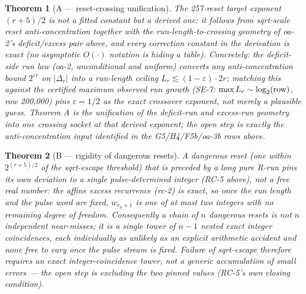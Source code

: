 \documentclass[11pt]{article}
\theoremstyle{plain}
\newtheorem{thm}{Theorem}[section]
\theoremstyle{definition}
\theoremstyle{remark}
\let\origmathrm\mathrm
\renewcommand{\mathrm}[1]{\ifmmode\origmathrm{#1}\else\textrm{#1}\fi}%
\begin{document}
\begin{thm}[A — reset-crossing unification]
The 257-reset target exponent $(r+5)/2$ is not a fitted constant but a \emph{derived} one: it
follows from sqrt-scale reset anti-concentration together with the run-length-to-crossing
geometry of oa-2's deficit/excess pair above, and every correction constant in the derivation is
exact (no asymptotic $O(\cdot)$ notation is hiding a table). Concretely: the deficit-side run law
(oa-2, unconditional and uniform) converts any anti-concentration bound $2^{\varepsilon r}$ on
$|\Delta_r|$ into a run-length ceiling $L_r \lesssim (1-\varepsilon)\cdot 2r$; matching this
against the certified maximum observed run growth (SE-7: $\max L_r \sim \log_2(\mathrm{row})$,
row 200{,}000) pins $\varepsilon = 1/2$ as the exact crossover exponent, not merely a plausible
guess. Theorem A is the unification of the deficit-run and excess-run geometry into one crossing
socket at that derived exponent; the open step is exactly the anti-concentration input identified
in the G5/H4/F5b/oa-3b rows above.
\end{thm}

\begin{thm}[B — rigidity of dangerous resets]
A dangerous reset (one within $2^{(r+5)/2}$ of the sqrt-escape threshold) that is preceded by a
long pure R-run pins its own deviation to a single pulse-determined integer (RC-5 above), not a
free real number: the affine excess recurrence (rc-2) is exact, so once the run length and the
pulse word are fixed, $w_{r_0+1}$ is one of at most two integers with no remaining degree of
freedom. Consequently a chain of $n$ dangerous resets is not $n$ independent near-misses; it is
a single tower of $n{-}1$ nested exact integer coincidences, each individually as unlikely as an
explicit arithmetic accident and none free to vary once the pulse stream is fixed. Failure of
sqrt-escape therefore requires an exact integer-coincidence tower, not a generic accumulation of
small errors — the open step is excluding the two pinned values (RC-5's own closing condition).
\end{thm}
\end{document}
